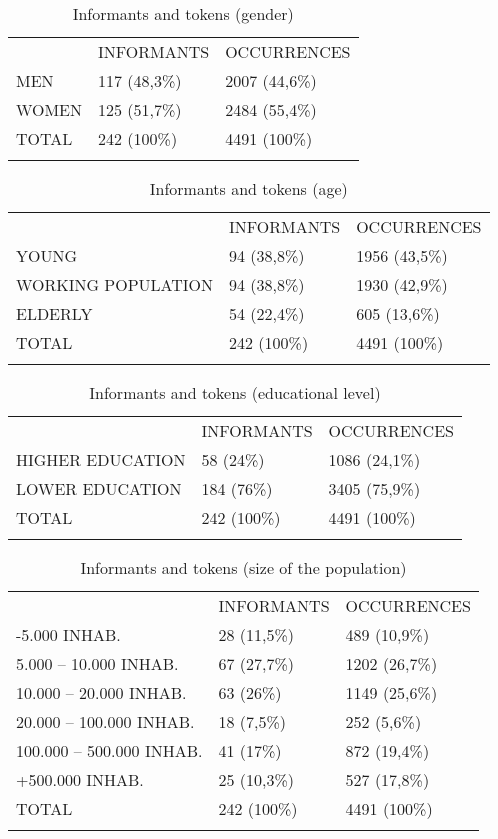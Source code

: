 \documentclass[output=paper]{LSP/langsci}
\begin{document}
\begin{table}
\begin{tabular}{lll} & INFORMANTS & OCCURRENCES\\
\lsptoprule
MEN & 117 (48,3\%) & 2007 (44,6\%)\\
WOMEN & 125 (51,7\%) & 2484 (55,4\%)\\
TOTAL & 242 (100\%) & 4491 (100\%)\\
\lspbottomrule
\end{tabular}
\label{tab:4}
\caption{Informants and tokens (gender)}
\end{table}

\begin{table}
\begin{tabular}{lll} & INFORMANTS & OCCURRENCES\\
\lsptoprule
YOUNG & 94 (38,8\%) & 1956 (43,5\%)\\
WORKING POPULATION & 94 (38,8\%) & 1930 (42,9\%)\\
ELDERLY & 54 (22,4\%) & 605 (13,6\%)\\
TOTAL & 242 (100\%) & 4491 (100\%)\\
\lspbottomrule
\end{tabular}
\label{tab:5}
\caption{Informants and tokens (age)}
\end{table}

\begin{table}
\begin{tabular}{lll} & INFORMANTS & OCCURRENCES\\
\lsptoprule
HIGHER EDUCATION & 58 (24\%) & 1086 (24,1\%)\\
LOWER EDUCATION & 184 (76\%) & 3405 (75,9\%)\\
TOTAL & 242 (100\%) & 4491 (100\%)\\
\lspbottomrule
\end{tabular}
\label{tab:6}
\caption{Informants and tokens (educational level)}
\end{table}

\begin{table}
\begin{tabular}{lll} & INFORMANTS & OCCURRENCES\\
\lsptoprule
{}-5.000 INHAB. & 28 (11,5\%) & 489 (10,9\%)\\
5.000 – 10.000 INHAB. & 67 (27,7\%) & 1202 (26,7\%)\\
10.000 – 20.000 INHAB. & 63 (26\%) & 1149 (25,6\%)\\
20.000 – 100.000 INHAB. & 18 (7,5\%) & 252 (5,6\%)\\
100.000 – 500.000 INHAB. & 41 (17\%) & 872 (19,4\%)\\
+500.000 INHAB. & 25 (10,3\%) & 527 (17,8\%)\\
TOTAL & 242 (100\%) & 4491 (100\%)\\
\lspbottomrule
\end{tabular}
\label{tab:7}
\caption{Informants and tokens (size of the population)}
\end{table}
\end{document}
